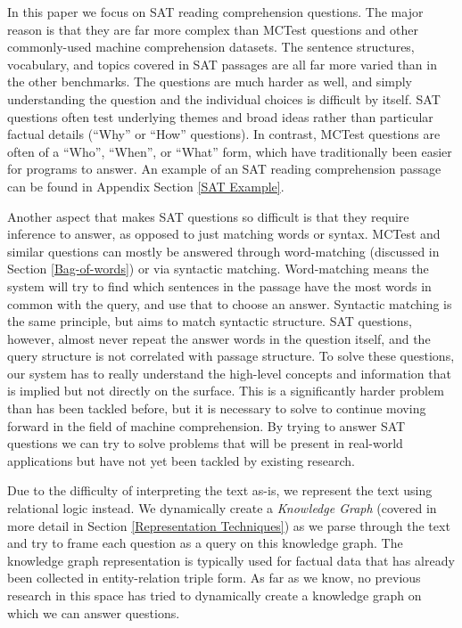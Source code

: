 \documentclass[pageno]{final_paper}
\begin{document}
In this paper we focus on SAT reading comprehension questions. The major reason
is that they are far more complex than MCTest questions and other commonly-used
machine comprehension datasets. The sentence structures, vocabulary, and topics
covered in SAT passages are all far more varied than in the other benchmarks.
The questions are much harder as well, and simply understanding the question and
the individual choices is difficult by itself. SAT questions often test
underlying themes and broad ideas rather than particular factual details
(``Why'' or ``How'' questions). In contrast, MCTest questions are often of a
``Who'', ``When'', or ``What'' form, which have traditionally been easier for
programs to answer. An example of an SAT reading comprehension passage can be
found in Appendix Section \ref{SAT Example}.

Another aspect that makes SAT questions so difficult is that they require
inference to answer, as opposed to just matching words or syntax. MCTest and
similar questions can mostly be answered through word-matching (discussed in
Section \ref{Bag-of-words}) or via syntactic matching. Word-matching means the
system will try to find which sentences in the passage have the most words in
common with the query, and use that to choose an answer. Syntactic matching is
the same principle, but aims to match syntactic structure. SAT questions,
however, almost never repeat the answer words in the question itself, and the
query structure is not correlated with passage structure. To solve these
questions, our system has to really understand the high-level concepts and
information that is implied but not directly on the surface. This is a
significantly harder problem than has been tackled before, but it is necessary
to solve to continue moving forward in the field of machine comprehension. By
trying to answer SAT questions we can try to solve problems that will be present
in real-world applications but have not yet been tackled by existing research.

Due to the difficulty of interpreting the text as-is, we represent the text
using relational logic instead. We dynamically create a \textit{Knowledge Graph}
(covered in more detail in Section \ref{Representation Techniques}) as we parse
through the text and try to frame each question as a query on this knowledge
graph. The knowledge graph representation is typically used for factual data
that has already been collected in entity-relation triple form. As far as we
know, no previous research in this space has tried to dynamically create a
knowledge graph on which we can answer questions.
\end{document}
